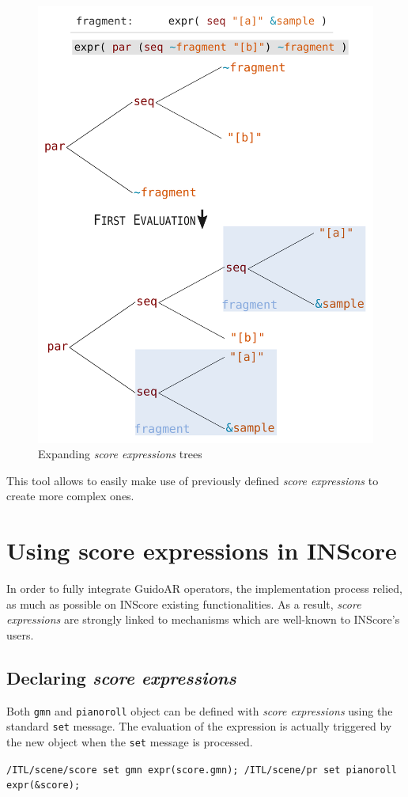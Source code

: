 \documentclass{article}
\newcommand{\OSC}[1]{\texttt{#1}}
\newcommand{\sExpr}{\emph{score expressions} }
\newcommand{\sample}	[1]			{\vspace{-1.8em}\begin{center}\colorbox{mygrey}{\begin{minipage}[t]{1\columnwidth} {\small \texttt{#1}}\end{minipage}}\end{center}}
\begin{document}
\begin{figure}[th]
\centering
\includegraphics[width=0.9\columnwidth]{imgs/expandingTree}
\caption{Expanding \sExpr trees
\label{fig:expandingTree}}
\end{figure}

This tool allows to easily make use of previously defined \sExpr	 to create more complex ones.


\section{Using score expressions in INScore}

In order to fully integrate GuidoAR operators, the implementation process relied, as much as possible on INScore existing functionalities. As a result, \sExpr are strongly linked to mechanisms which are well-known to INScore's users.

\subsection{Declaring \sExpr}
Both \OSC{gmn} and \OSC{pianoroll} object can be defined with \sExpr using the standard \OSC{set} message. The evaluation of the expression is actually triggered by the new object when the \OSC{set} message is processed.
\sample{/ITL/scene/score set gmn expr(score.gmn);
/ITL/scene/pr set pianoroll expr(\&score);
}
\end{document}
